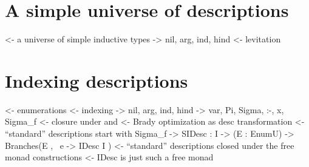 \documentclass[preprint, authoryear, onecolumn]{sigplanconf}
\newenvironment{structure}{\footnotesize\verbatim}{\endverbatim}
\begin{document}


\section{A simple universe of descriptions}

\begin{structure}
<- a universe of simple inductive types
    -> nil, arg, ind, hind
<- levitation
\end{structure}


\section{Indexing descriptions}


\begin{structure}
<- enumerations
<- indexing
    -> nil, arg, ind, hind
    -> var, Pi, Sigma, :-, x, Sigma_f
<- closure under \box and \diamond
<- Brady optimization as desc transformation
<- ``standard'' descriptions start with Sigma_f
    -> SIDesc : I -> (E : EnumU) -> Branches(E , \ e -> IDesc I )
<- ``standard'' descriptions closed under the free monad constructions
<- IDesc is just such a free monad
\end{structure}
\end{document}
